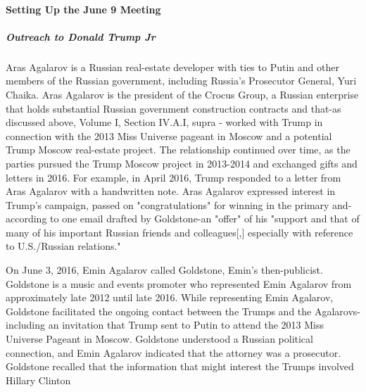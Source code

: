 \paragraph{Setting Up the June 9 Meeting}

\subparagraph{Outreach to Donald Trump Jr}

Aras Agalarov is a Russian real-estate developer with ties to Putin and other members of the Russian government, including Russia's Prosecutor General, Yuri Chaika.%
Aras Agalarov is the president of the Crocus Group, a Russian enterprise that holds substantial Russian government construction contracts and that-as discussed above, Volume I, Section IV.A.I, supra - worked with Trump in connection with the 2013 Miss Universe pageant in Moscow and a potential Trump Moscow real-estate project.%
The relationship continued over time, as the parties pursued the Trump Moscow project in 2013-2014 and exchanged gifts and letters in 2016.%
For example, in April 2016, Trump responded to a letter from Aras Agalarov with a handwritten note.%
Aras Agalarov expressed interest in Trump's campaign, passed on "congratulations" for winning in the primary and-according to one email drafted by Goldstone-an "offer" of his "support and that of many of his important Russian friends and colleagues[,] especially with reference to U.S./Russian relations."%

On June 3, 2016, Emin Agalarov called Goldstone, Emin's then-publicist.%
Goldstone is a music and events promoter who represented Emin Agalarov from approximately late 2012 until late 2016.%
While representing Emin Agalarov, Goldstone facilitated the ongoing contact between the Trumps and the Agalarovs-including an invitation that Trump sent to Putin to attend the 2013 Miss Universe Pageant in Moscow.%
Goldstone understood
a Russian political connection, and Emin Agalarov indicated that the attorney was a prosecutor.%
Goldstone recalled that the information that might interest the Trumps involved Hillary Clinton

